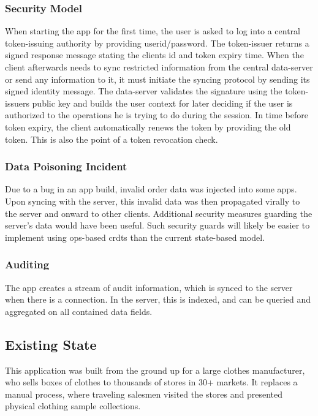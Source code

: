 \documentclass[11pt,a4paper]{report}
\begin{document}
\subsubsection{Security Model}
When starting the app for the first time, the user is asked to log into a central token-issuing authority by providing userid/password. The token-issuer returns a signed response message stating the clients id and token expiry time.
When the client afterwards needs to sync restricted information from the central data-server or send any information to it, it must initiate the syncing protocol by sending its signed identity message. The data-server validates the signature using the token-issuers public key and builds the user context for later deciding if the user is authorized to the operations he is trying to do during the session.
In time before token expiry, the client automatically renews the token by providing the old token. This is also the point of a token revocation check.

\subsubsection{Data Poisoning Incident}
Due to a bug in an app build, invalid order data was injected into some apps. Upon syncing with the server, this invalid data was then propagated virally to the server and onward to other clients.
Additional security measures guarding the server's data would have been useful. Such security guards will likely be easier to implement using ops-based \glspl{crdt} than the current state-based model.
\subsubsection{Auditing}

The app creates a stream of audit information, which is synced to the server when there is a connection. In the server, this is indexed, and can be queried and aggregated on all contained data fields.

\subsection{Existing State}
This application was built from the ground up for a large clothes manufacturer, who sells boxes of clothes to thousands of stores in 30+ markets.
It replaces a manual process, where traveling salesmen visited the stores and presented physical clothing sample collections.
\end{document}
